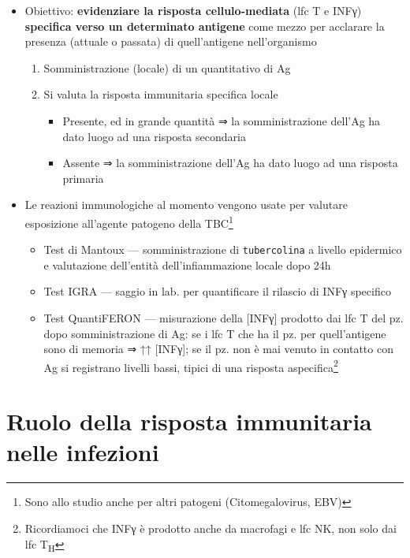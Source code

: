 \documentclass[italian,]{article}
\providecommand{\tightlist}{%
  \setlength{\itemsep}{0pt}\setlength{\parskip}{0pt}}
\begin{document}
\begin{itemize}
\tightlist
\item
  Obiettivo: \textbf{evidenziare la risposta cellulo-mediata} (lfc T e
  INFγ) \textbf{specifica verso un determinato antigene} come mezzo per
  acclarare la presenza (attuale o passata) di quell'antigene
  nell'organismo

  \begin{enumerate}
  \def\labelenumi{\arabic{enumi}.}
  \tightlist
  \item
    Somministrazione (locale) di un quantitativo di Ag
  \item
    Si valuta la risposta immunitaria specifica locale

    \begin{itemize}
    \tightlist
    \item
      Presente, ed in grande quantità ⇒ la somministrazione dell'Ag ha
      dato luogo ad una risposta secondaria
    \item
      Assente ⇒ la somministrazione dell'Ag ha dato luogo ad una
      risposta primaria
    \end{itemize}
  \end{enumerate}
\item
  Le reazioni immunologiche al momento vengono usate per valutare
  esposizione all'agente patogeno della TBC\footnote{Sono allo studio
    anche per altri patogeni (Citomegalovirus, EBV)}

  \begin{itemize}
  \tightlist
  \item
    Test di Mantoux --- somministrazione di \texttt{tubercolina} a
    livello epidermico e valutazione dell'entità dell'infiammazione
    locale dopo 24h
  \item
    Test IGRA --- saggio in lab. per quantificare il rilascio di INFγ
    specifico
  \item
    Test QuantiFERON --- misurazione della {[}INFγ{]} prodotto dai lfc T
    del pz. dopo somministrazione di Ag: se i lfc T che ha il pz. per
    quell'antigene sono di memoria ⇒ ↑↑ {[}INFγ{]}; se il pz. non è mai
    venuto in contatto con Ag si registrano livelli bassi, tipici di una
    risposta aspecifica\footnote{Ricordiamoci che INFγ è prodotto anche
      da macrofagi e lfc NK, non solo dai lfc T\textsubscript{H}}
  \end{itemize}
\end{itemize}

\hypertarget{ruolo-della-risposta-immunitaria-nelle-infezioni}{%
\section{Ruolo della risposta immunitaria nelle
infezioni}\label{ruolo-della-risposta-immunitaria-nelle-infezioni}}
\end{document}
